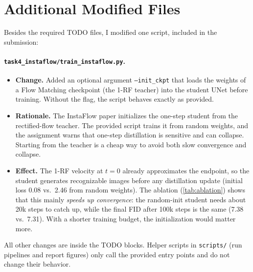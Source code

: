 \section{Additional Modified Files}
\label{sec:modified}

Besides the required TODO files, I modified one script, included in the submission:

\paragraph{\texttt{task4\_instaflow/train\_instaflow.py}.}
\begin{itemize}
  \item \textbf{Change.} Added an optional argument \texttt{--init\_ckpt} that loads the weights of a Flow Matching checkpoint (the 1-RF teacher) into the student UNet before training. Without the flag, the script behaves exactly as provided.
  \item \textbf{Rationale.} The InstaFlow paper initializes the one-step student from the rectified-flow teacher. The provided script trains it from random weights, and the assignment warns that one-step distillation is sensitive and can collapse. Starting from the teacher is a cheap way to avoid both slow convergence and collapse.
  \item \textbf{Effect.} The 1-RF velocity at $t=0$ already approximates the endpoint, so the student generates recognizable images before any distillation update (initial loss 0.08 vs.\ 2.46 from random weights). The ablation (\cref{tab:ablation}) shows that this mainly \emph{speeds up convergence}: the random-init student needs about 20k steps to catch up, while the final FID after 100k steps is the same (7.38 vs.\ 7.31). With a shorter training budget, the initialization would matter more.
\end{itemize}

All other changes are inside the TODO blocks.
Helper scripts in \texttt{scripts/} (run pipelines and report figures) only call the provided entry points and do not change their behavior.
